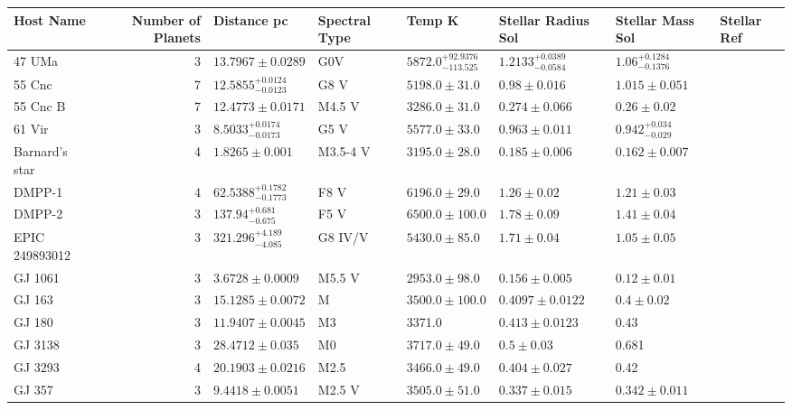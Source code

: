 \begin{tabular}{lrllllll}
\toprule
Host Name & Number of Planets & Distance pc & Spectral Type & Temp K & Stellar Radius Sol & Stellar Mass Sol & Stellar Ref \\
\midrule
47 UMa & 3 & $13.7967 \pm 0.0289$ & G0V & $5872.0^{+92.9376}_{-113.525}$ & $1.2133^{+0.0389}_{-0.0584}$ & $1.06^{+0.1284}_{-0.1376}$ & \cite{STASSUN_ET_AL__2019} \\
55 Cnc & 7 & $12.5855^{+0.0124}_{-0.0123}$ & G8 V & $5198.0 \pm 31.0$ & $0.98 \pm 0.016$ & $1.015 \pm 0.051$ & \cite{MOUTOU_ET_AL_2026} \\
55 Cnc B & 7 & $12.4773 \pm 0.0171$ & M4.5 V & $3286.0 \pm 31.0$ & $0.274 \pm 0.066$ & $0.26 \pm 0.02$ & \cite{MOUTOU_ET_AL_2026} \\
61 Vir & 3 & $8.5033^{+0.0174}_{-0.0173}$ & G5 V & $5577.0 \pm 33.0$ & $0.963 \pm 0.011$ & $0.942^{+0.034}_{-0.029}$ & \cite{VOGT_ET_AL__2010} \\
Barnard's star & 4 & $1.8265 \pm 0.001$ & M3.5-4 V & $3195.0 \pm 28.0$ & $0.185 \pm 0.006$ & $0.162 \pm 0.007$ & \cite{GONZALEZ_HERNANDEZ_ET_AL_2024} \\
DMPP-1 & 4 & $62.5388^{+0.1782}_{-0.1773}$ & F8 V & $6196.0 \pm 29.0$ & $1.26 \pm 0.02$ & $1.21 \pm 0.03$ & \cite{STAAB_ET_AL__2020} \\
DMPP-2 & 3 & $137.94^{+0.681}_{-0.675}$ & F5 V & $6500.0 \pm 100.0$ & $1.78 \pm 0.09$ & $1.41 \pm 0.04$ & \cite{HASWELL_ET_AL__2020} \\
EPIC 249893012 & 3 & $321.296^{+4.189}_{-4.085}$ & G8 IV/V & $5430.0 \pm 85.0$ & $1.71 \pm 0.04$ & $1.05 \pm 0.05$ & \cite{HIDALGO_ET_AL__2020} \\
GJ 1061 & 3 & $3.6728 \pm 0.0009$ & M5.5 V & $2953.0 \pm 98.0$ & $0.156 \pm 0.005$ & $0.12 \pm 0.01$ & \cite{DREIZLER_ET_AL_2025} \\
GJ 163 & 3 & $15.1285 \pm 0.0072$ & M & $3500.0 \pm 100.0$ & $0.4097 \pm 0.0122$ & $0.4 \pm 0.02$ & \cite{TUOMI_ET_AL__2013} \\
GJ 180 & 3 & $11.9407 \pm 0.0045$ & M3 & 3371.0 & $0.413 \pm 0.0123$ & 0.43 & \cite{TUOMI_ET_AL__2014} \\
GJ 3138 & 3 & $28.4712 \pm 0.035$ & M0 & $3717.0 \pm 49.0$ & $0.5 \pm 0.03$ & 0.681 & \cite{ASTUDILLO_DEFRU_ET_AL__2017} \\
GJ 3293 & 4 & $20.1903 \pm 0.0216$ & M2.5 & $3466.0 \pm 49.0$ & $0.404 \pm 0.027$ & 0.42 & \cite{ASTUDILLO_DEFRU_ET_AL__2017} \\
GJ 357 & 3 & $9.4418 \pm 0.0051$ & M2.5 V & $3505.0 \pm 51.0$ & $0.337 \pm 0.015$ & $0.342 \pm 0.011$ & \cite{ODDO_ET_AL__2023} \\

\end{tabular}
